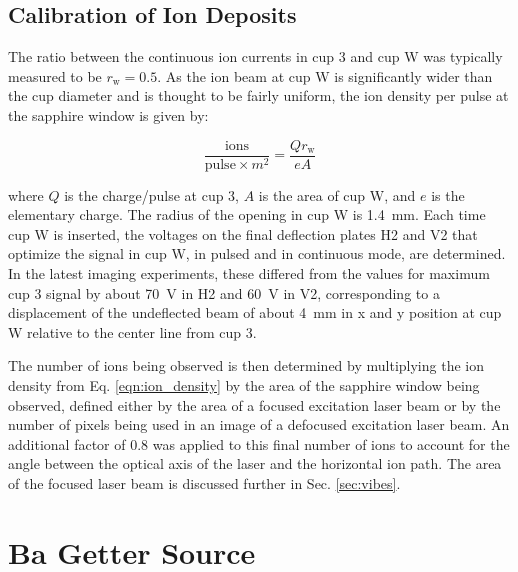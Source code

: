 \subsection{Calibration of Ion Deposits}
\label{subsec:ionDepCal}

The ratio between the continuous ion currents in cup 3 and cup W was typically measured to be $r_{\text{w}} = 0.5$.  As the ion beam at cup W is significantly wider than the cup diameter and is thought to be fairly uniform, the ion density per pulse at the sapphire window is given by:

\begin{equation}
\frac{\text{ions}}{\text{pulse} \times m^{2}} = \frac{Q r_{\text{w}}}{e A}
\label{eqn:ion_density}
\end{equation}

\noindent
where $Q$ is the charge/pulse at cup 3, $A$ is the area of cup W, and $e$ is the elementary charge.  The radius of the opening in cup W is 1.4~mm.  Each time cup W is inserted, the voltages on the final deflection plates H2 and V2 that optimize the signal in cup W, in pulsed and in continuous mode, are determined.  In the latest imaging experiments, these differed from the values for maximum cup 3 signal by about 70~V in H2 and 60~V in V2, corresponding to a displacement of the undeflected beam of about 4~mm in x and y position at cup W relative to the center line from cup 3.

The number of ions being observed is then determined by multiplying the ion density from Eq. \ref{eqn:ion_density} by the area of the sapphire window being observed, defined either by the area of a focused excitation laser beam or by the number of pixels being used in an image of a defocused excitation laser beam.  An additional factor of 0.8 was applied to this final number of ions to account for the angle between the optical axis of the laser and the horizontal ion path.  The area of the focused laser beam is discussed further in Sec. \ref{sec:vibes}.

\section{Ba Getter Source}
\label{sec:getter}

